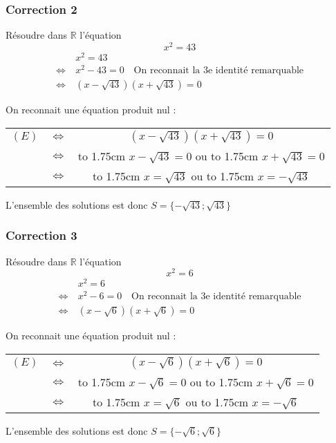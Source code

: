 \documentclass[15pt, mathserif]{beamer}
\newcommand{\R}{\mathbb{R}}			%
\begin{document}
\begin{frame}
\vspace{-10mm}
	\frametitle{Correction 2}
Résoudre dans $\R$ l'équation $$x^2=43$$ 
 \begin{align*} 
 & x^2=43 \\ 
 \Leftrightarrow ~& x^2- 43 =0 \text{~~ On reconnait la 3e identité remarquable} \\ 
 \Leftrightarrow ~ & (x-\sqrt{43})(x+\sqrt{43})=0 
 \end{align*}
 
  On reconnait une équation produit nul : 
 
 	\begin{tabular}{ccc} $(E)$ & $\Leftrightarrow$ & $(x-\sqrt{43})(x+ \sqrt{43})=0$  \\
		& $\Leftrightarrow$ &  \hbox to 1.75cm {\hfill $x-\sqrt{43}= 0$\hfill} \quad  ou \quad  \hbox to 1.75cm {\hfill $x+\sqrt{43}=0$\hfill} \\
		 & $\Leftrightarrow$ & \hbox to 1.75cm {\hfill $x = \sqrt{43} $\hfill} \quad  ou \quad \hbox to 1.75cm {\hfill $x = -\sqrt{43}$ \hfill} 
 \end{tabular} 
 
 L'ensemble des solutions est donc $S=\{-\sqrt{43};\sqrt{43}\}$\end{frame}


\begin{frame}
\vspace{-10mm}
	\frametitle{Correction 3}
Résoudre dans $\R$ l'équation $$x^2=6$$ 
 \begin{align*} 
 & x^2=6 \\ 
 \Leftrightarrow ~& x^2- 6 =0 \text{~~ On reconnait la 3e identité remarquable} \\ 
 \Leftrightarrow ~ & (x-\sqrt{6})(x+\sqrt{6})=0 
 \end{align*}
 
  On reconnait une équation produit nul : 
 
 	\begin{tabular}{ccc} $(E)$ & $\Leftrightarrow$ & $(x-\sqrt{6})(x+ \sqrt{6})=0$  \\
		& $\Leftrightarrow$ &  \hbox to 1.75cm {\hfill $x-\sqrt{6}= 0$\hfill} \quad  ou \quad  \hbox to 1.75cm {\hfill $x+\sqrt{6}=0$\hfill} \\
		 & $\Leftrightarrow$ & \hbox to 1.75cm {\hfill $x = \sqrt{6} $\hfill} \quad  ou \quad \hbox to 1.75cm {\hfill $x = -\sqrt{6}$ \hfill} 
 \end{tabular} 
 
 L'ensemble des solutions est donc $S=\{-\sqrt{6};\sqrt{6}\}$\end{frame}
\end{document}

